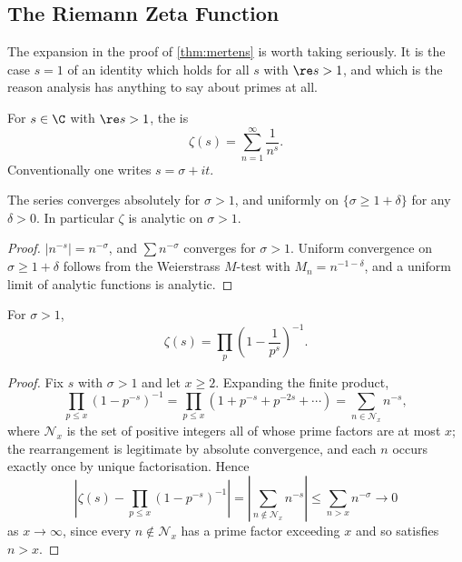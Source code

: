 \subsection{The Riemann Zeta Function}

The expansion in the proof of \autoref{thm:mertens} is worth taking seriously. It is the case $s = 1$ of an identity which holds for all $s$ with $\re s > 1$, and which is the reason analysis has anything to say about primes at all.

\begin{definition}
	For $s \in \C$ with $\re s > 1$, the  is
	$$
	\zeta(s) = \sum_{n=1}^\infty \frac1{n^s}.
	$$
	Conventionally one writes $s = \sigma + it$.
\end{definition}

\begin{lemma}
	The series converges absolutely for $\sigma > 1$, and uniformly on $\{\sigma \geq 1 + \delta\}$ for any $\delta > 0$. In particular $\zeta$ is analytic on $\sigma > 1$.
\end{lemma}
\begin{proof}
	$|n^{-s}| = n^{-\sigma}$, and $\sum n^{-\sigma}$ converges for $\sigma > 1$. Uniform convergence on $\sigma \geq 1+\delta$ follows from the Weierstrass $M$-test with $M_n = n^{-1-\delta}$, and a uniform limit of analytic functions is analytic.
\end{proof}

\begin{theorem}\label{thm:eulerproduct}
	For $\sigma > 1$,
	$$
	\zeta(s) = \prod_p \left(1 - \frac1{p^s}\right)^{-1}.
	$$
\end{theorem}
\begin{proof}
	Fix $s$ with $\sigma > 1$ and let $x \geq 2$. Expanding the finite product,
	$$
	\prod_{p \leq x}\left(1 - p^{-s}\right)^{-1} = \prod_{p \leq x}\left(1 + p^{-s} + p^{-2s} + \cdots\right) = \sum_{n \in \mathcal N_x} n^{-s},
	$$
	where $\mathcal N_x$ is the set of positive integers all of whose prime factors are at most $x$; the rearrangement is legitimate by absolute convergence, and each $n$ occurs exactly once by unique factorisation. Hence
	$$
	\left|\zeta(s) - \prod_{p \leq x}\left(1 - p^{-s}\right)^{-1}\right| = \left|\sum_{n \notin \mathcal N_x}n^{-s}\right| \leq \sum_{n > x}n^{-\sigma} \longrightarrow 0
	$$
	as $x \to \infty$, since every $n \notin \mathcal N_x$ has a prime factor exceeding $x$ and so satisfies $n > x$.
\end{proof}

